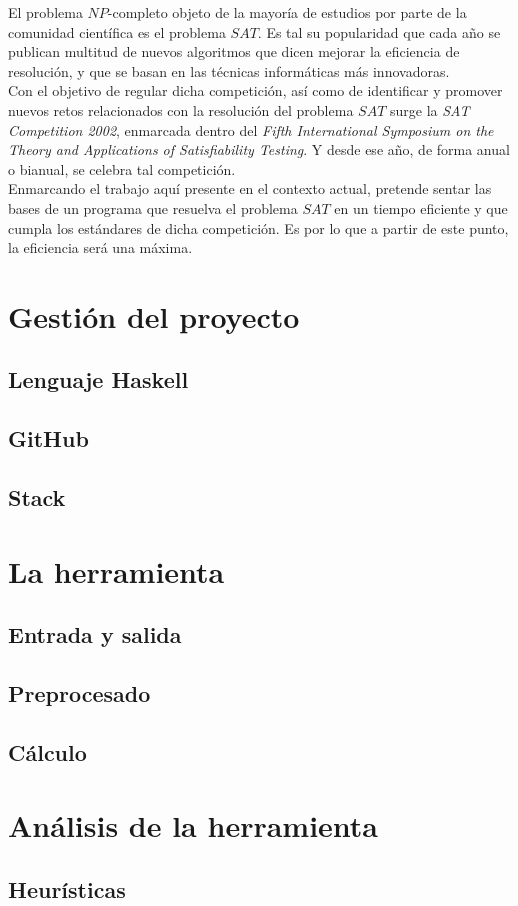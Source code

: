 El problema $NP$-completo objeto de la mayoría de estudios por parte de la comunidad científica es el problema $SAT$. Es tal su popularidad que cada año se publican multitud de nuevos algoritmos que dicen mejorar la eficiencia de resolución, y que se basan en las técnicas informáticas más innovadoras. \\

Con el objetivo de regular dicha competición, así como de identificar y promover nuevos retos relacionados con la resolución del problema $SAT$ surge la \textit{SAT Competition 2002}, enmarcada dentro del \textit{Fifth  International Symposium on the Theory and Applications of Satisfiability Testing}. Y desde ese año, de forma anual o bianual, se celebra tal competición. \\

Enmarcando el trabajo aquí presente en el contexto actual, pretende sentar las bases de un programa que resuelva el problema $SAT$ en un tiempo eficiente y que cumpla los estándares de dicha competición. Es por lo que a partir de este punto, la eficiencia será una máxima.


\section{Gestión del proyecto}

\subsection{Lenguaje Haskell}

\subsection{GitHub}

\subsection{Stack}

\section{La herramienta}

\subsection{Entrada y salida}

\subsection{Preprocesado}

\subsection{Cálculo}

\section{Análisis de la herramienta}

\subsection{Heurísticas}